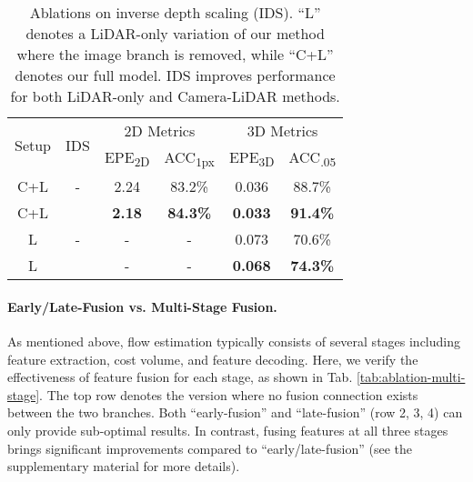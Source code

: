 \documentclass[10pt,twocolumn,letterpaper]{article}
\begin{document}
\begin{table}[t]
    \centering
    \begin{tabular}{c|c|cc|cc}
    \hline
    \multirow{2}{*}{Setup} & \multirow{2}{*}{IDS} & \multicolumn{2}{c|}{2D Metrics} & \multicolumn{2}{c}{3D Metrics} \\
    & & EPE\textsubscript{2D} & ACC\textsubscript{1px} & EPE\textsubscript{3D} & ACC\textsubscript{.05} \\
    \hline
    C+L & -       & 2.24 & 83.2\% & 0.036 & 88.7\% \\
    C+L &  & \textbf{2.18} & \textbf{84.3\%} & \textbf{0.033} & \textbf{91.4\%} \\
    \hline
    L & -         & - & - & 0.073 & 70.6\% \\
    L &    & - & - & \textbf{0.068} & \textbf{74.3\%} \\
    \hline
    \end{tabular}
    \vspace{-5pt}
    \caption{Ablations on inverse depth scaling (IDS). ``L'' denotes a LiDAR-only variation of our method where the image branch is removed, while ``C+L'' denotes our full model. IDS improves performance for both LiDAR-only and Camera-LiDAR methods.}
    \vspace{-5pt}
    \label{tab:ablation-ids}
\end{table}

\vspace{-10pt}
\paragraph{Early/Late-Fusion vs. Multi-Stage Fusion.} As mentioned above, flow estimation typically consists of several stages including feature extraction, cost volume, and feature decoding. Here, we verify the effectiveness of feature fusion for each stage, as shown in Tab. \ref{tab:ablation-multi-stage}. The top row denotes the version where no fusion connection exists between the two branches. Both ``early-fusion'' and ``late-fusion'' (row 2, 3, 4) can only provide sub-optimal results. In contrast, fusing features at all three stages brings significant improvements compared to ``early/late-fusion'' (see the supplementary material for more details).
\end{document}
